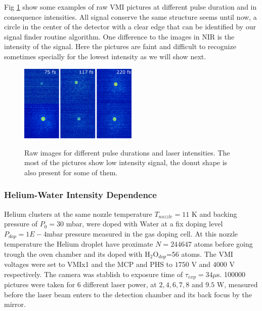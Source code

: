 Fig \ref{fig;MIrlaserraw} show some examples of raw VMI pictures at different pulse duration and in consequence intensities. All signal conserve the same structure seems until now, a circle in the center of the detector with a clear edge that can be identified by our signal finder routine algorithm. One difference to the images in NIR is the intensity of the signal. Here the pictures are faint and  difficult to recognize sometimes specially for the lowest intensity as we will show next.

\begin{figure}[hbtp]
\caption[MIR He laser parameter examples ]{Raw images for different pulse durations and laser intensities. The most of the pictures show low intensity signal, the donut shape is also present for some of them.}
\centering
\includegraphics[width=0.5\textwidth]{../Images/results/MIR_He_pulsescan/raw/RAW_MIR_He_pulsescan.png}
\label{fig;MIrlaserraw}
\end{figure}

\subsubsection{Helium-Water Intensity Dependence}

Helium clusters at the same nozzle temperature $T_{nozzle}=11$ K and backing pressure of $P_{0}=30$ mbar, were doped with Water at a fix doping level $P_{dop}=1E-4$mbar pressure measured in the gas doping cell. At this nozzle temperature the Helium droplet have proximate $N=244647$ atoms before going trough the oven chamber and its doped with H$_{2}$O$_{dop}$=56 atoms. The VMI voltages were set to VMIx1 and the MCP and PHS to $1750$ V and $4000$ V respectively. The camera was stablish to exposure time of $\tau_{exp}=34 \mu$s. 100000 pictures were taken for 6 different laser power, at $2, 4, 6, 7, 8$ and $9.5$ W, measured before the laser beam enters to the detection chamber and its back focus by the mirror. 


